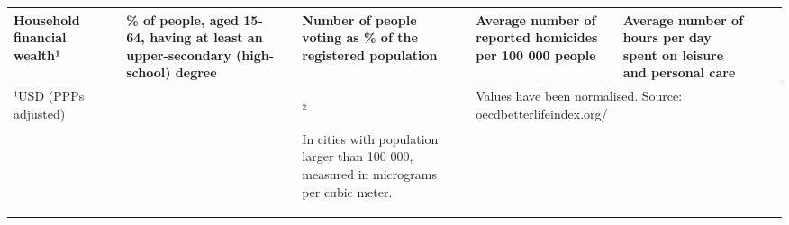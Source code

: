 \documentclass{article}
\begin{document}
\begin{tabular}{p{4.3cm}p{0.1cm}p{4.3cm}p{0.1cm}p{4.3cm}p{0.1cm}p{4.3cm}p{0.1cm}p{4.3cm}p{0.1cm}p{0.1cm}}
\tabularnewline
\raggedright Household financial wealth¹ &  & \raggedright \% of people, aged 15-64, having at least an upper-secondary (high-school) degree &  & \raggedright Number of people voting as \% of the registered population  &  & \raggedright Average number of reported homicides per 100 000 people &  & \raggedright Average number of hours per day spent on leisure and personal care& 
\tabularnewline
\bottomrule
¹\scriptsize USD (PPPs adjusted) & & & & ²\scriptsize \raggedright In cities with population larger than 100 000, measured in micrograms  per cubic meter. & &  \multicolumn{4}{l}{  \hfill Values have been normalised. Source: oecdbetterlifeindex.org/}
\end{tabular}
\end{document}
